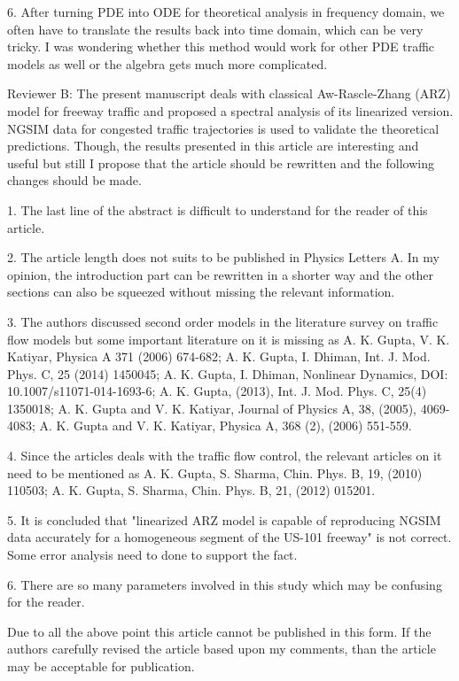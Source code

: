 \documentclass[preprint]{elsarticle}
\begin{document}
6. After turning PDE into ODE for theoretical analysis in frequency domain, we often have to translate the results back into time domain, which can be very tricky. I was wondering whether this method would work for other PDE traffic models as well or the algebra gets much more complicated.





\newpage

Reviewer B: The present manuscript deals with classical Aw-Rascle-Zhang (ARZ) model for freeway traffic and proposed a spectral analysis of its linearized version. NGSIM data for congested traffic trajectories is used to validate the theoretical predictions. Though, the results presented in this article are interesting and useful but still I propose that the article should be rewritten and the following changes should be made.

1. The last line of the abstract is difficult to understand for the reader of this article.

2. The article length does not suits to be published in Physics Letters A. In my opinion, the introduction part can be rewritten in a shorter way and the other sections can also be squeezed without missing the relevant information.

3. The authors discussed second order models in the literature survey on traffic flow models but some important literature on it is missing as A. K. Gupta, V. K. Katiyar, Physica A 371 (2006) 674-682;  A. K. Gupta, I. Dhiman, Int. J. Mod. Phys. C, 25 (2014) 1450045; A. K. Gupta, I. Dhiman, Nonlinear Dynamics, DOI: 10.1007/s11071-014-1693-6; A. K. Gupta, (2013), Int. J. Mod. Phys. C, 25(4) 1350018; A. K. Gupta and V. K. Katiyar, Journal of Physics A, 38, (2005), 4069-4083; A. K. Gupta and V. K. Katiyar, Physica A, 368 (2), (2006) 551-559.

4. Since the articles deals with the traffic flow control, the relevant articles on it need to be mentioned as A. K. Gupta, S. Sharma, Chin. Phys. B, 19, (2010) 110503; A. K. Gupta, S. Sharma, Chin. Phys. B, 21, (2012) 015201.

5. It is concluded that "linearized ARZ model is capable of reproducing NGSIM data accurately for a homogeneous segment of the US-101 freeway" is not correct. Some error analysis need to done to support the fact.

6. There are so many parameters involved in this study which may be confusing for the reader.

Due to all the above point this article cannot be published in this form. If the authors carefully revised the article based upon my comments, than the article may be acceptable for publication.
\end{document}
